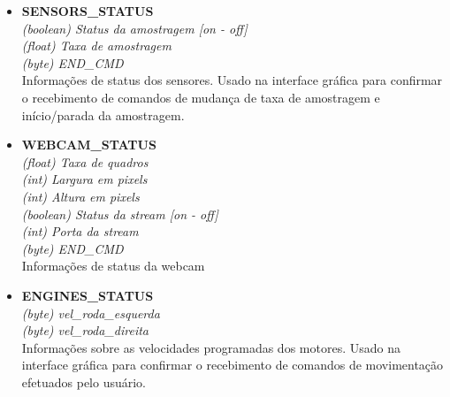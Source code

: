 \begin{itemize}
\begin{itemize}
      \item \textbf{SENSORS\_STATUS} \\
	\textit{(boolean) Status da amostragem [on - off] }\\
	\textit{(float) Taxa de amostragem}\\
	\textit{(byte) END\_CMD}\\
	Informações de status dos sensores. Usado na interface gráfica para confirmar o recebimento de comandos de mudança de taxa de amostragem e início/parada da amostragem.

      \item \textbf{WEBCAM\_STATUS} \\
	\textit{(float) Taxa de quadros }\\
	\textit{(int) Largura em pixels }\\
	\textit{(int) Altura em pixels }\\
	\textit{(boolean) Status da stream [on - off] }\\
	\textit{(int) Porta da stream}\\
	\textit{(byte) END\_CMD}\\
	Informações de status da webcam
	
      \item \textbf{ENGINES\_STATUS} \\
	\textit{(byte) vel\_roda\_esquerda}\\
	\textit{(byte) vel\_roda\_direita}\\
	Informações sobre as velocidades programadas dos motores. Usado na interface gráfica para confirmar o recebimento de comandos de movimentação efetuados pelo usuário.

	

    \end{itemize}
\end{itemize}
